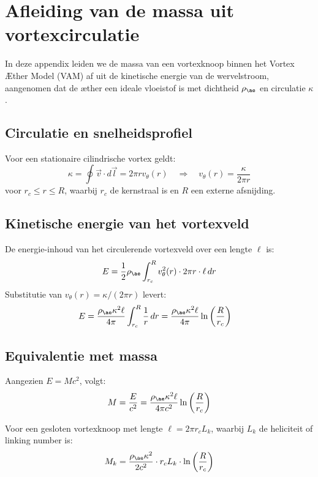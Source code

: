 \section{Afleiding van de massa uit vortexcirculatie}

In deze appendix leiden we de massa van een vortexknoop binnen het Vortex Æther Model (VAM) af uit de kinetische energie van de wervelstroom, aangenomen dat de æther een ideale vloeistof is met dichtheid \( \rho_{\ae} \) en circulatie \( \kappa \).

\subsection{Circulatie en snelheidsprofiel}
Voor een stationaire cilindrische vortex geldt:
\begin{equation}
    \kappa = \oint \vec{v} \cdot d\vec{l} = 2\pi r v_\theta(r) \quad \Rightarrow \quad v_\theta(r) = \frac{\kappa}{2\pi r}
\end{equation}
voor \( r_c \leq r \leq R \), waarbij \( r_c \) de kernstraal is en \( R \) een externe afsnijding.

\subsection{Kinetische energie van het vortexveld}
De energie-inhoud van het circulerende vortexveld over een lengte \( \ell \) is:
\begin{equation}
    E = \frac{1}{2} \rho_{\ae} \int_{r_c}^{R} v_\theta^2(r) \cdot 2\pi r \cdot \ell \, dr
\end{equation}
Substitutie van \( v_\theta(r) = \kappa / (2\pi r) \) levert:
\begin{align}
    E &= \frac{\rho_{\ae} \kappa^2 \ell}{4\pi} \int_{r_c}^{R} \frac{1}{r} \, dr = \frac{\rho_{\ae} \kappa^2 \ell}{4\pi} \ln\left( \frac{R}{r_c} \right)
\end{align}

\subsection{Equivalentie met massa}
Aangezien \( E = M c^2 \), volgt:
\begin{equation}
    M = \frac{E}{c^2} = \frac{\rho_{\ae} \kappa^2 \ell}{4\pi c^2} \ln\left( \frac{R}{r_c} \right)
\end{equation}

Voor een gesloten vortexknoop met lengte \( \ell = 2\pi r_c L_k \), waarbij \( L_k \) de heliciteit of linking number is:
\begin{equation}
    M_k = \frac{\rho_{\ae} \kappa^2}{2 c^2} \cdot r_c L_k \cdot \ln\left( \frac{R}{r_c} \right)
\end{equation}

